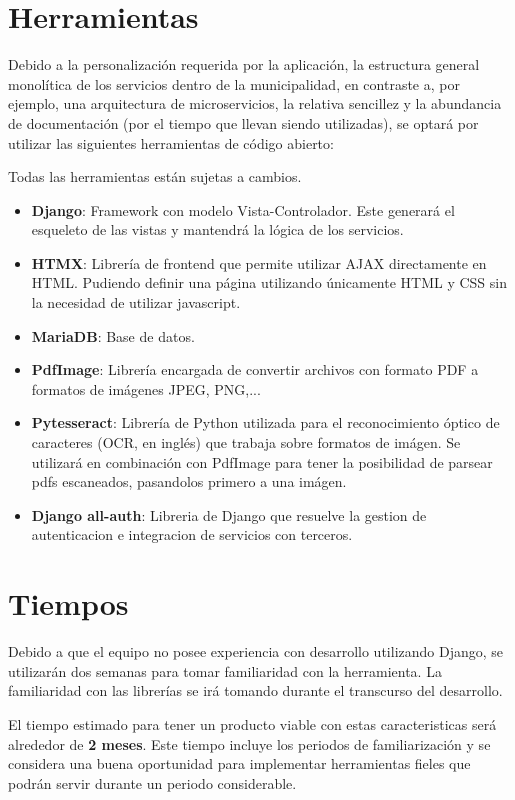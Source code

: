 \documentclass{article}
\begin{document}
\section{Herramientas}
Debido a la personalización requerida por la aplicación, la estructura general monolítica de los servicios 
dentro de la municipalidad, en contraste a, por ejemplo, una arquitectura de microservicios,
la relativa sencillez y la abundancia de documentación (por el tiempo que llevan siendo utilizadas), 
se optará por utilizar las siguientes herramientas de código abierto:

Todas las herramientas están sujetas a cambios.
\begin{itemize}
    \item \textbf{Django}: Framework con modelo Vista-Controlador. Este generará el esqueleto de las vistas y mantendrá la lógica de los servicios.
    \item \textbf{HTMX}: Librería de frontend que permite utilizar AJAX directamente en HTML. Pudiendo definir una página utilizando únicamente HTML y CSS sin la necesidad de utilizar javascript.
    \item \textbf{MariaDB}: Base de datos.
    \item \textbf{PdfImage}: Librería encargada de convertir archivos con formato PDF a formatos de imágenes JPEG, PNG,...
    \item \textbf{Pytesseract}: Librería de Python utilizada para el reconocimiento óptico de caracteres (OCR, en inglés) que trabaja sobre formatos de imágen. Se utilizará en combinación con PdfImage para tener la posibilidad de parsear pdfs escaneados, pasandolos primero a una imágen.
    \item \textbf{Django all-auth}: Libreria de Django que resuelve la gestion de autenticacion e integracion de servicios con terceros.
\end{itemize}

\section{Tiempos}
Debido a que el equipo no posee experiencia con desarrollo utilizando Django, se utilizarán dos semanas para tomar familiaridad con la herramienta.
La familiaridad con las librerías se irá tomando durante el transcurso del desarrollo. 

El tiempo estimado para tener un producto viable con estas caracteristicas será alrededor de \textbf{2 meses}.
Este tiempo incluye los periodos de familiarización y se considera una buena oportunidad para implementar herramientas
fieles que podrán servir durante un periodo considerable.
\end{document}
